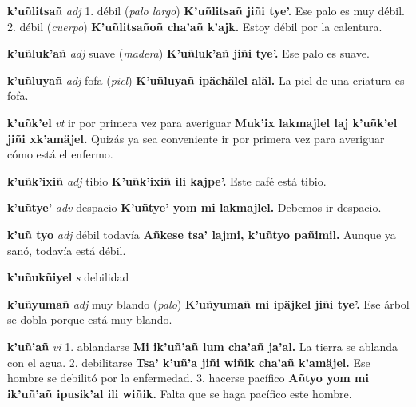 \documentclass[10pt]{scrbook}
\newcommand{\entry}[1]{\textbf{#1}}
\newcommand{\onedefinition}[1]{#1.}
\newcommand{\partofspeech}[1]{\textit{#1}}
\newcommand{\spanishtranslation}[1]{#1}
\newcommand{\clarification}[1]{(\textit{#1})}
\newcommand{\cholexample}[1]{\textbf{#1}}
\newcommand{\exampletranslation}[1]{#1}
\begin{document}
\begin{multicols}{2}
\entry{k'uñlitsañ}
\partofspeech{adj}
\onedefinition{1}
\spanishtranslation{débil}
\clarification{palo largo}
\cholexample{K'uñlitsañ jiñi tye'.}
\exampletranslation{Ese palo es muy débil.}
\onedefinition{2}
\spanishtranslation{débil}
\clarification{cuerpo}
\cholexample{K'uñlitsañoñ cha'añ k'ajk.}
\exampletranslation{Estoy débil por la calentura.}

\entry{k'uñluk'añ}
\partofspeech{adj}
\spanishtranslation{suave}
\clarification{madera}
\cholexample{K'uñluk'añ jiñi tye'.}
\exampletranslation{Ese palo es suave.}

\entry{k'uñluyañ}
\partofspeech{adj}
\spanishtranslation{fofa}
\clarification{piel}
\cholexample{K'uñluyañ ipächälel aläl.}
\exampletranslation{La piel de una criatura es fofa.}

\entry{k'uñk'el}
\partofspeech{vt}
\spanishtranslation{ir por primera vez para averiguar}
\cholexample{Muk'ix lakmajlel laj k'uñk'el jiñi xk'amäjel.}
\exampletranslation{Quizás ya sea conveniente ir por primera vez para averiguar cómo está el enfermo.}

\entry{k'uñk'ixiñ}
\partofspeech{adj}
\spanishtranslation{tibio}
\cholexample{K'uñk'ixiñ ili kajpe'.}
\exampletranslation{Este café está tibio.}

\entry{k'uñtye'}
\partofspeech{adv}
\spanishtranslation{despacio}
\cholexample{K'uñtye' yom mi lakmajlel.}
\exampletranslation{Debemos ir despacio.}

\entry{k'uñ tyo}
\partofspeech{adj}
\spanishtranslation{débil todavía}
\cholexample{Añkese tsa' lajmi, k'uñtyo pañimil.}
\exampletranslation{Aunque ya sanó, todavía está débil.}

\entry{k'uñukñiyel}
\partofspeech{s}
\spanishtranslation{debilidad}

\entry{k'uñyumañ}
\partofspeech{adj}
\spanishtranslation{muy blando}
\clarification{palo}
\cholexample{K'uñyumañ mi ipäjkel jiñi tye'.}
\exampletranslation{Ese árbol se dobla porque está muy blando.}

\entry{k'uñ'añ}
\partofspeech{vi}
\onedefinition{1}
\spanishtranslation{ablandarse}
\cholexample{Mi ik'uñ'añ lum cha'añ ja'al.}
\exampletranslation{La tierra se ablanda con el agua.}
\onedefinition{2}
\spanishtranslation{debilitarse}
\cholexample{Tsa' k'uñ'a jiñi wiñik cha'añ k'amäjel.}
\exampletranslation{Ese hombre se debilitó por la enfermedad.}
\onedefinition{3}
\spanishtranslation{hacerse pacífico}
\cholexample{Añtyo yom mi ik'uñ'añ ipusik'al ili wiñik.}
\exampletranslation{Falta que se haga pacífico este hombre.}


\end{multicols}
\end{document}
